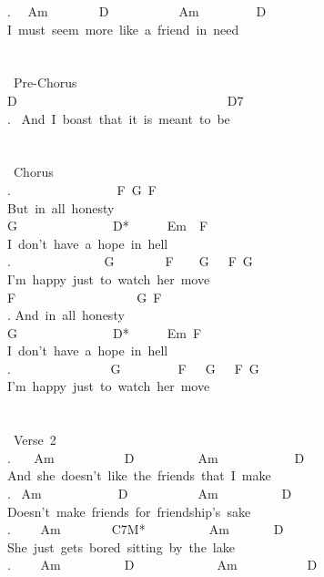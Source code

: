 {. \ \ Am\ \ \ \ \ \ \ \ D\ \ \ \ \ \ \ \ \ \ \ Am\ \ \ \ \ \ \ \ \ D\\
I\ must\ seem\ more\ like\ a\ friend\ in\ need\\
\\
\\
\lbrack\ Pre-Chorus\rbrack\\
D\ \ \ \ \ \ \ \ \ \ \ \ \ \ \ \ \ \ \ \ \ \ \ \ \ \ \ \ \ \ \ \ \ D7\\
. \ And\ I\ boast\ that\ it\ is\ meant\ to\ be\\
\\
\\
\lbrack\ Chorus\rbrack\\
. \ \ \ \ \ \ \ \ \ \ \ \ \ \ \ \ F\ G\ F\\
But\ in\ all\ honesty\\
G\ \ \ \ \ \ \ \ \ \ \ \ \ \ \ D*\ \ \ \ \ \ Em\ \ F\\
I\ don't\ have\ a\ hope\ in\ hell\\
. \ \ \ \ \ \ \ \ \ \ \ \ \ \ G\ \ \ \ \ \ \ \ F\ \ \ \ G\ \ \ F\ G\\
I'm\ happy\ just\ to\ watch\ her\ move\\
F\ \ \ \ \ \ \ \ \ \ \ \ \ \ \ \ \ \ \ G\ F\\
. And\ in\ all\ honesty\\
G\ \ \ \ \ \ \ \ \ \ \ \ \ \ \ D*\ \ \ \ \ \ Em\ F\\
I\ don't\ have\ a\ hope\ in\ hell\\
. \ \ \ \ \ \ \ \ \ \ \ \ \ \ \ G\ \ \ \ \ \ \ \ \ F\ \ \ G\ \ \ F\ G\\
I'm\ happy\ just\ to\ watch\ her\ move\\
\\
\\
\lbrack\ Verse\ 2\rbrack\\
. \ \ \ Am\ \ \ \ \ \ \ \ \ \ \ D\ \ \ \ \ \ \ \ \ \ Am\ \ \ \ \ \ \ \ \ \ \ \ D\\
And\ she\ doesn't\ like\ the\ friends\ that\ I\ make\\
. \ Am\ \ \ \ \ \ \ \ \ \ \ \ D\ \ \ \ \ \ \ \ \ \ \ Am\ \ \ \ \ \ \ \ \ \ D\\
Doesn't\ make\ friends\ for\ friendship's\ sake\\
. \ \ \ \ Am\ \ \ \ \ \ \ \ C7M*\ \ \ \ \ \ \ \ \ \ Am\ \ \ \ \ \ \ D\\
She\ just\ gets\ bored\ sitting\ by\ the\ lake\\
. \ \ \ \ Am\ \ \ \ \ \ \ \ \ \ D\ \ \ \ \ \ \ \ \ \ \ \ \ Am\ \ \ \ \ \ \ \ \ \ \ D\\
}
